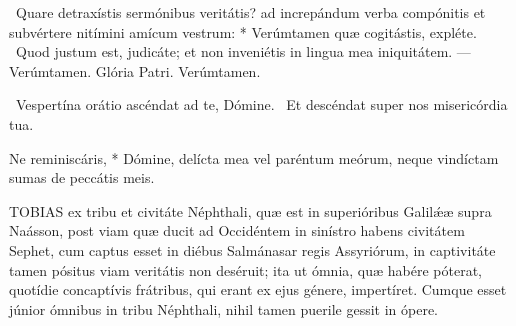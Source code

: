 \R\ Quare detraxístis sermónibus veritátis? ad increpándum verba compónitis et subvértere nitímini amícum vestrum: * Verúmtamen quæ cogitástis, expléte. \V\ Quod justum est, judicáte; et non inveniétis in lingua mea iniquitátem. — Verúmtamen. Glória Patri. Verúmtamen.


\V\ Vespertína orátio ascéndat ad te, Dómine. \R\ Et descéndat super nos misericórdia tua.

 Ne reminiscáris, * Dómine, delícta mea vel paréntum meórum, neque vindíctam sumas de peccátis meis.







\lettrine[lines=2]{T}{OBIAS} ex tribu et civitáte Néphthali, quæ est in superióribus Galilǽæ supra Naásson, post viam quæ ducit ad Occidéntem in sinístro habens civitátem Sephet, cum captus esset in diébus Salmánasar regis Assyriórum, in captivitáte tamen pósitus viam veritátis non deséruit; ita ut ómnia, quæ habére póterat, quotídie concaptívis frátribus, qui erant ex ejus génere, impertíret. Cumque esset júnior ómnibus in tribu Néphthali, nihil tamen puerile gessit in ópere.

